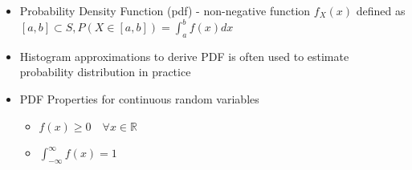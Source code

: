 \documentclass{article}
\begin{document}
\begin{itemize}
\begin{itemize}
        \item General idea: discretize the distribution by putting the possible values the random variable can take into "bins" ($P(x_1 \le X \le x_2$)
    \end{itemize}
    \item Probability Density Function (pdf) - non-negative function $f_X(x)$ defined as $[a,b] \subset S, P(X \in [a,b]) = \int_a^b f(x)dx$
    \item Histogram approximations to derive PDF is often used to estimate probability distribution in practice
    \item PDF Properties for continuous random variables
    \begin{itemize}
        \item $f(x) \ge 0 \quad \forall x \in \mathbb{R}$
        \item $\int_{-\infty}^\infty f(x)=1$
    \end{itemize}
\end{itemize}
\end{document}
